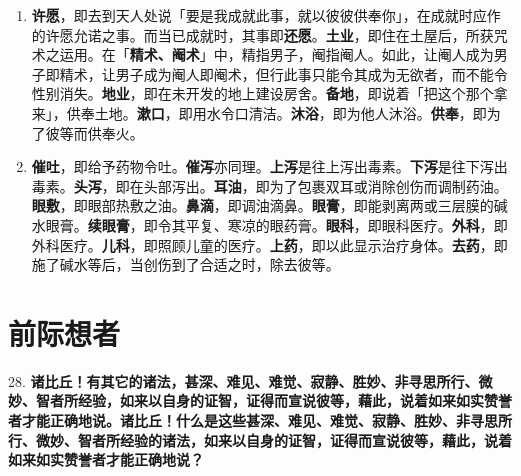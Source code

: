\begin{enumerate}\item \textbf{许愿}，即去到天人处说「要是我成就此事，就以彼彼供奉你」，在成就时应作的许愿允诺之事。而当已成就时，其事即\textbf{还愿}。\textbf{土业}，即住在土屋后，所获咒术之运用。在「\textbf{精术、阉术}」中，精指男子，阉指阉人。如此，让阉人成为男子即精术，让男子成为阉人即阉术，但行此事只能令其成为无欲者，而不能令性别消失。\textbf{地业}，即在未开发的地上建设房舍。\textbf{备地}，即说着「把这个那个拿来」，供奉土地。\textbf{漱口}，即用水令口清洁。\textbf{沐浴}，即为他人沐浴。\textbf{供奉}，即为了彼等而供奉火。
\item \textbf{催吐}，即给予药物令吐。\textbf{催泻}亦同理。\textbf{上泻}是往上泻出毒素。\textbf{下泻}是往下泻出毒素。\textbf{头泻}，即在头部泻出。\textbf{耳油}，即为了包裹双耳或消除创伤而调制药油。\textbf{眼敷}，即眼部热敷之油。\textbf{鼻滴}，即调油滴鼻。\textbf{眼膏}，即能剥离两或三层膜的碱水眼膏。\textbf{续眼膏}，即令其平复、寒凉的眼药膏。\textbf{眼科}，即眼科医疗。\textbf{外科}，即外科医疗。\textbf{儿科}，即照顾儿童的医疗。\textbf{上药}，即以此显示治疗身体。\textbf{去药}，即施了碱水等后，当创伤到了合适之时，除去彼等。\end{enumerate}

\section{前际想者}

{\Large 28.} \textbf{诸比丘！有其它的诸法，甚深、难见、难觉、寂静、胜妙、非寻思所行、微妙、智者所经验，如来以自身的证智，证得而宣说彼等，藉此，说着如来如实赞誉者才能正确地说。诸比丘！什么是这些甚深、难见、难觉、寂静、胜妙、非寻思所行、微妙、智者所经验的诸法，如来以自身的证智，证得而宣说彼等，藉此，说着如来如实赞誉者才能正确地说？}

